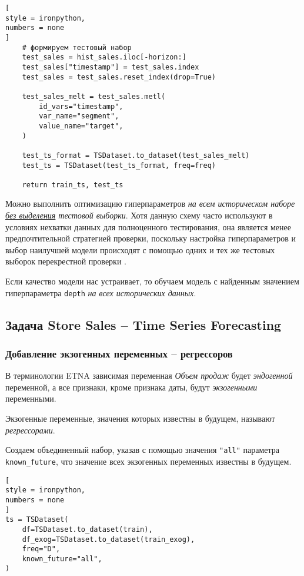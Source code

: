\documentclass[%
	11pt,
	a4paper,
	utf8,
		]{article}
\begin{document}
\begin{lstlisting}[
style = ironpython,
numbers = none
]
    # формируем тестовый набор
    test_sales = hist_sales.iloc[-horizon:]
    test_sales["timestamp"] = test_sales.index
    test_sales = test_sales.reset_index(drop=True)
    
    test_sales_melt = test_sales.metl(
        id_vars="timestamp",
        var_name="segment",
        value_name="target",
    )
    
    test_ts_format = TSDataset.to_dataset(test_sales_melt)
    test_ts = TSDataset(test_ts_format, freq=freq)
    
    return train_ts, test_ts
\end{lstlisting}

Можно выполнить оптимизацию гиперпараметров \emph{на всем историческом наборе \underline{без выделения} тестовой выборки}. Хотя данную схему часто используют в условиях нехватки данных для полноценного тестирования, она является менее предпочтительной стратегией проверки, поскольку настройка гиперпараметров и выбор наилучшей модели происходят с помощью одних и тех же тестовых выборок перекрестной проверки \cite[]{gruzdev:time-series-2022}.

Если качество модели нас устраивает, то обучаем модель с найденным значением гиперпараметра \verb|depth| \emph{на всех исторических данных}.

\subsection{Задача Store Sales -- Time Series Forecasting}

\subsubsection{Добавление экзогенных переменных -- регрессоров}

В терминологии ETNA зависимая переменная \emph{Объем продаж} будет \emph{эндогенной} переменной, а все признаки, кроме признака даты, будут \emph{экзогенными} переменными.

Экзогенные переменные, значения которых известны в будущем, называют \emph{регрессорами}.

Создаем объединенный набор, указав с помощью значения \verb|"all"| параметра \verb|known_future|, что значение всех экзогенных переменных известны в будущем.
\begin{lstlisting}[
style = ironpython,
numbers = none
]
ts = TSDataset(
    df=TSDataset.to_dataset(train),
    df_exog=TSDataset.to_dataset(train_exog),
    freq="D",
    known_future="all",
)
\end{lstlisting}
\end{document}
